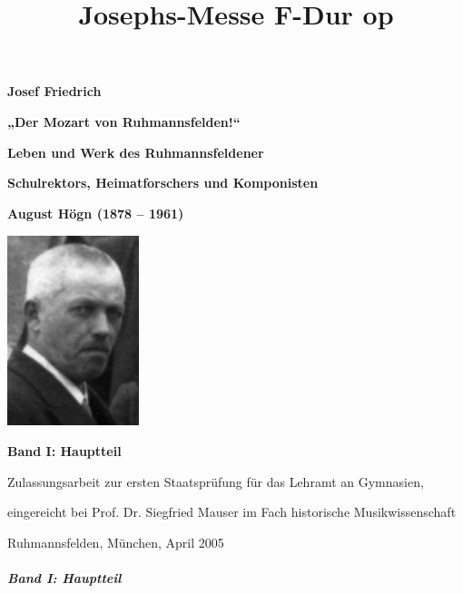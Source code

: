 \documentclass[a4paper]{article}
\title{Josephs-Messe F-Dur op}
\begin{document}
{\centering\bfseries
Josef Friedrich
\par}

{\centering
\textbf{„Der Mozart von Ruhmannsfelden!“}
\par}

{\centering\bfseries
\textmd{Leben und Werk des Ruhmannsfeldener }
\par}

{\centering\bfseries
\textmd{Schulrektors, Heimatforschers und Komponisten }
\par}

{\centering\bfseries
\textmd{August Högn (1878 – 1961)}
\par}

{\centering
\includegraphics[width=3.836cm,height=5.556cm]{pictures/August-Hoegn_Nachruf.jpg}
 \par}
{\centering\bfseries
Band I: Hauptteil
\par}

{\centering
Zulassungsarbeit zur ersten Staatsprüfung für das Lehramt an Gymnasien,
\par}

{\centering
eingereicht bei Prof. Dr. Siegfried Mauser im Fach historische
Musikwissenschaft
\par}

{\centering
Ruhmannsfelden, München, April 2005
\par}


\subparagraph[Band I: Hauptteil]{Band I: Hauptteil}
\setcounter{tocdepth}{4}
\renewcommand\contentsname{}
\tableofcontents
















\end{document}
